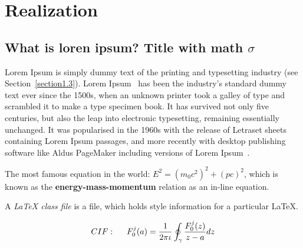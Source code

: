 
\chapter{Realization}  %

\ifpdf
    \graphicspath{{Chapter4/Figs/Raster/}{Chapter4/Figs/PDF/}{Chapter4/Figs/}}
\else
    \graphicspath{{Chapter4/Figs/Vector/}{Chapter4/Figs/}}
\fi


\section{What is loren ipsum? Title with math \texorpdfstring{$\sigma$}{[sigma]}} %

Lorem Ipsum is simply dummy text of the printing and typesetting industry (see
Section~\ref{section1.3}). Lorem Ipsum~\citep{Aup91} has been the industry's
standard dummy text ever since the 1500s, when an unknown printer took a galley
of type and scrambled it to make a type specimen book. It has survived not only
five centuries, but also the leap into electronic typesetting, remaining
essentially unchanged. It was popularised in the 1960s with the release of
Letraset sheets containing Lorem Ipsum passages, and more recently with desktop
publishing software like Aldus PageMaker including versions of Lorem
Ipsum~\citep{AAB95,Con90,LM65}.

The most famous equation in the world: $E^2 = (m_0c^2)^2 + (pc)^2$, which is
known as the \textbf{energy-mass-momentum} relation as an in-line equation.

A {\em \LaTeX{} class file} is a file, which holds style information for a particular \LaTeX{}.


\begin{align}
CIF: \hspace*{5mm}F_0^j(a) = \frac{1}{2\pi \iota} \oint_{\gamma} \frac{F_0^j(z)}{z - a} dz
\end{align}


